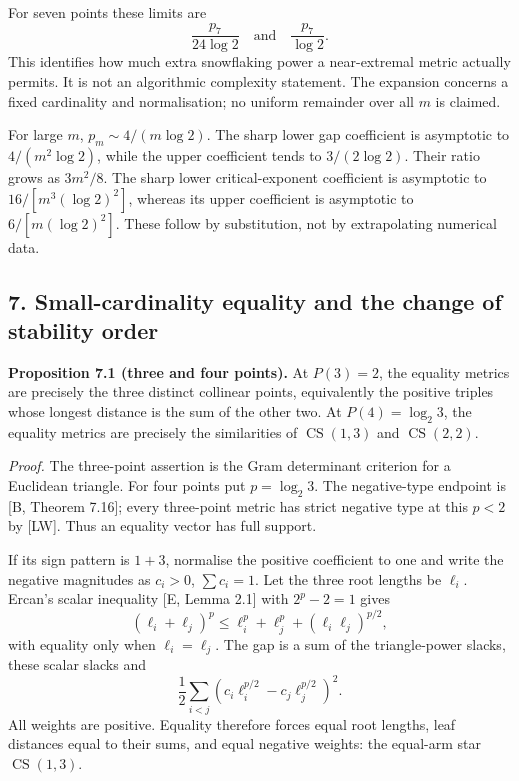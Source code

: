 \documentclass[11pt,a4paper]{article}
\begin{document}
For seven points these limits are
\[\frac{p_7}{24\log2}\quad\text{and}\quad\frac{p_7}{\log2}.\] This
identifies how much extra snowflaking power a near-extremal metric
actually permits. It is not an algorithmic complexity statement. The
expansion concerns a fixed cardinality and normalisation; no uniform
remainder over all \(m\) is claimed.

For large \(m\), \(p_m\sim4/(m\log2)\). The sharp lower gap coefficient
is asymptotic to \(4/(m^2\log2)\), while the upper coefficient tends to
\(3/(2\log2)\). Their ratio grows as \(3m^2/8\). The sharp lower
critical-exponent coefficient is asymptotic to \(16/[m^3(\log2)^2]\),
whereas its upper coefficient is asymptotic to \(6/[m(\log2)^2]\). These
follow by substitution, not by extrapolating numerical data.

\subsection{7. Small-cardinality equality and the change of stability
order}\label{small-cardinality-equality-and-the-change-of-stability-order}

\textbf{Proposition 7.1 (three and four points).} At \(P(3)=2\), the
equality metrics are precisely the three distinct collinear points,
equivalently the positive triples whose longest distance is the sum of
the other two. At \(P(4)=\log_2 3\), the equality metrics are precisely
the similarities of \(\operatorname{CS}(1,3)\) and
\(\operatorname{CS}(2,2)\).

\emph{Proof.} The three-point assertion is the Gram determinant
criterion for a Euclidean triangle. For four points put \(p=\log_2 3\).
The negative-type endpoint is {[}B, Theorem 7.16{]}; every three-point
metric has strict negative type at this \(p<2\) by {[}LW{]}. Thus an
equality vector has full support.

If its sign pattern is \(1+3\), normalise the positive coefficient to
one and write the negative magnitudes as \(c_i>0\), \(\sum c_i=1\). Let
the three root lengths be \(\ell_i\). Ercan's scalar inequality {[}E,
Lemma 2.1{]} with \(2^p-2=1\) gives
\[(\ell_i+\ell_j)^p\le\ell_i^p+\ell_j^p+(\ell_i\ell_j)^{p/2},\] with
equality only when \(\ell_i=\ell_j\). The gap is a sum of the
triangle-power slacks, these scalar slacks and
\[\frac12\sum_{i<j}(c_i\ell_i^{p/2}-c_j\ell_j^{p/2})^2.\] All weights
are positive. Equality therefore forces equal root lengths, leaf
distances equal to their sums, and equal negative weights: the equal-arm
star \(\operatorname{CS}(1,3)\).
\end{document}
